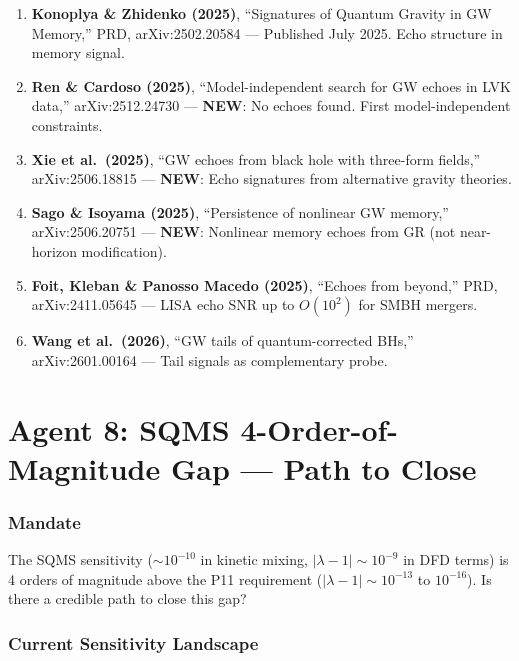 \documentclass[11pt,a4paper]{article}
\newcommand{\NEW}{\textcolor{dfdblue}{\textbf{NEW}}}
\begin{document}
\begin{enumerate}
\item \textbf{Konoplya \& Zhidenko (2025)}, ``Signatures of Quantum Gravity in GW Memory,'' PRD, arXiv:2502.20584 --- Published July 2025. Echo structure in memory signal.

\item \textbf{Ren \& Cardoso (2025)}, ``Model-independent search for GW echoes in LVK data,'' arXiv:2512.24730 --- \NEW: No echoes found. First model-independent constraints.

\item \textbf{Xie et al.\ (2025)}, ``GW echoes from black hole with three-form fields,'' arXiv:2506.18815 --- \NEW: Echo signatures from alternative gravity theories.

\item \textbf{Sago \& Isoyama (2025)}, ``Persistence of nonlinear GW memory,'' arXiv:2506.20751 --- \NEW: Nonlinear memory echoes from GR (not near-horizon modification).

\item \textbf{Foit, Kleban \& Panosso Macedo (2025)}, ``Echoes from beyond,'' PRD, arXiv:2411.05645 --- LISA echo SNR up to $O(10^2)$ for SMBH mergers.

\item \textbf{Wang et al.\ (2026)}, ``GW tails of quantum-corrected BHs,'' arXiv:2601.00164 --- Tail signals as complementary probe.
\end{enumerate}


\part{Agent 8: SQMS 4-Order-of-Magnitude Gap --- Path to Close}
\label{part:agent8}

\section{Mandate}

The SQMS sensitivity ($\sim 10^{-10}$ in kinetic mixing, $|\lambda-1| \sim 10^{-9}$ in DFD terms) is 4 orders of magnitude above the P11 requirement ($|\lambda-1| \sim 10^{-13}$ to $10^{-16}$). Is there a credible path to close this gap?

\section{Current Sensitivity Landscape}
\end{document}
